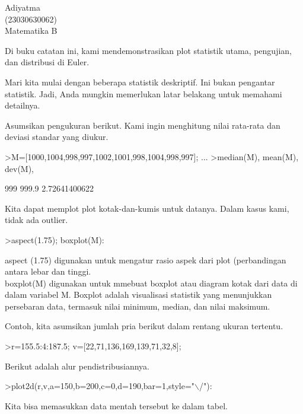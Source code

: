 \documentclass[a4paper,10pt]{article}
\begin{document}
\begin{eulernotebook}
\begin{eulercomment}
Adiyatma \\
(23030630062)\\
Matematika B\\
\begin{eulercomment}
\begin{eulercomment}
Di buku catatan ini, kami mendemonstrasikan plot statistik utama,
pengujian, dan distribusi di Euler.

Mari kita mulai dengan beberapa statistik deskriptif. Ini bukan
pengantar statistik. Jadi, Anda mungkin memerlukan latar belakang
untuk memahami detailnya.

Asumsikan pengukuran berikut. Kami ingin menghitung nilai rata-rata
dan deviasi standar yang diukur.
\end{eulercomment}
\begin{eulerprompt}
>M=[1000,1004,998,997,1002,1001,998,1004,998,997]; ...
>median(M), mean(M), dev(M),
\end{eulerprompt}
\begin{euleroutput}
  999
  999.9
  2.72641400622
\end{euleroutput}
\begin{eulercomment}
Kita dapat memplot plot kotak-dan-kumis untuk datanya. Dalam kasus
kami, tidak ada outlier.
\end{eulercomment}
\begin{eulerprompt}
>aspect(1.75); boxplot(M):
\end{eulerprompt}
\begin{eulercomment}
aspect (1.75) digunakan untuk mengatur rasio aspek dari plot
(perbandingan antara lebar dan tinggi.\\
boxplot(M) digunakan untuk mmebuat boxplot atau diagram kotak dari
data di dalam variabel M. Boxplot adalah visualisasi statistik yang
menunjukkan persebaran data, termasuk nilai minimum, median, dan nilai
maksimum.

Contoh, kita asumsikan jumlah pria berikut dalam rentang ukuran
tertentu.
\end{eulercomment}
\begin{eulerprompt}
>r=155.5:4:187.5; v=[22,71,136,169,139,71,32,8];
\end{eulerprompt}
\begin{eulercomment}
Berikut adalah alur pendistribusiannya.
\end{eulercomment}
\begin{eulerprompt}
>plot2d(r,v,a=150,b=200,c=0,d=190,bar=1,style="\(\backslash\)/"):
\end{eulerprompt}
\begin{eulercomment}
Kita bisa memasukkan data mentah tersebut ke dalam tabel.


\end{eulercomment}
\end{eulercomment}
\end{eulercomment}
\end{eulernotebook}
\end{document}

